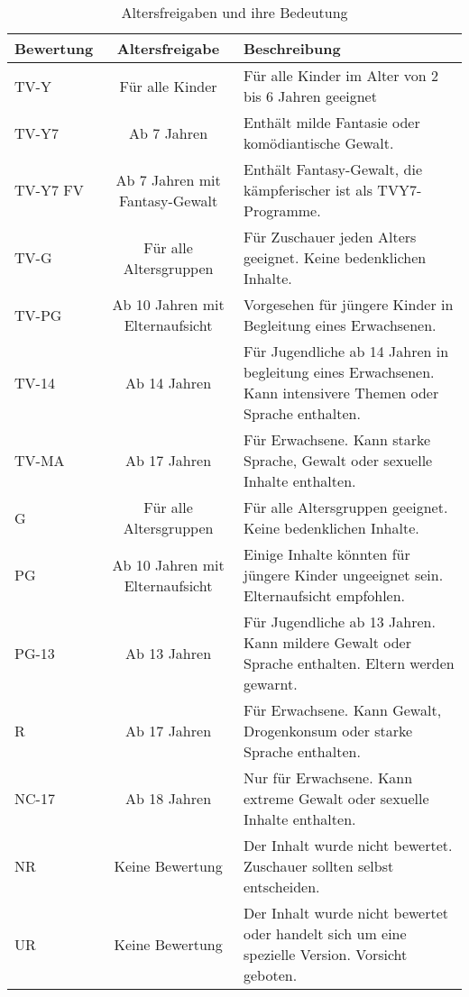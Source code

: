 \documentclass[border=1mm]{standalone}
\begin{document}
\begin{longtable}[t]{>{\raggedright\arraybackslash}p{8em}cl}
\caption{\label{tab:unnamed-chunk-2}Altersfreigaben und ihre Bedeutung}\\
\toprule
Bewertung & Altersfreigabe & Beschreibung\\
\midrule
TV-Y & Für alle Kinder & Für alle Kinder im Alter von 2 bis 6 Jahren geeignet\\
TV-Y7 & Ab 7 Jahren & Enthält milde Fantasie oder komödiantische Gewalt.\\
TV-Y7 FV & Ab 7 Jahren mit Fantasy-Gewalt & Enthält Fantasy-Gewalt, die kämpferischer ist als TVY7-Programme.\\
TV-G & Für alle Altersgruppen & Für Zuschauer jeden Alters geeignet. Keine bedenklichen Inhalte.\\
TV-PG & Ab 10 Jahren mit Elternaufsicht & Vorgesehen für jüngere Kinder in Begleitung eines Erwachsenen.\\
\addlinespace
TV-14 & Ab 14 Jahren & Für Jugendliche ab 14 Jahren in begleitung eines Erwachsenen. Kann intensivere Themen oder Sprache enthalten.\\
TV-MA & Ab 17 Jahren & Für Erwachsene. Kann starke Sprache, Gewalt oder sexuelle Inhalte enthalten.\\
G & Für alle Altersgruppen & Für alle Altersgruppen geeignet. Keine bedenklichen Inhalte.\\
PG & Ab 10 Jahren mit Elternaufsicht & Einige Inhalte könnten für jüngere Kinder ungeeignet sein. Elternaufsicht empfohlen.\\
PG-13 & Ab 13 Jahren & Für Jugendliche ab 13 Jahren. Kann mildere Gewalt oder Sprache enthalten. Eltern werden gewarnt.\\
\addlinespace
R & Ab 17 Jahren & Für Erwachsene. Kann Gewalt, Drogenkonsum oder starke Sprache enthalten.\\
NC-17 & Ab 18 Jahren & Nur für Erwachsene. Kann extreme Gewalt oder sexuelle Inhalte enthalten.\\
NR & Keine Bewertung & Der Inhalt wurde nicht bewertet. Zuschauer sollten selbst entscheiden.\\
UR & Keine Bewertung & Der Inhalt wurde nicht bewertet oder handelt sich um eine spezielle Version. Vorsicht geboten.\\
\bottomrule
\end{longtable}
\end{document}
